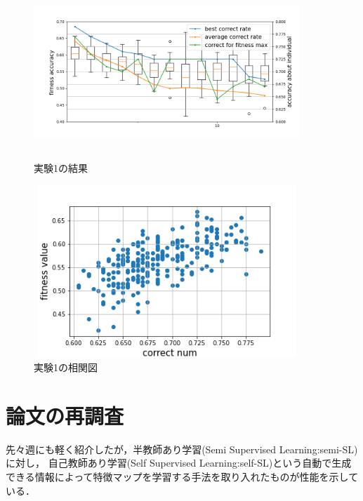 \documentclass[twocolumn]{jarticle}     %
\begin{document}
\begin{figure}[h]
	\begin{center}
		\vspace*{-3mm}
		\hspace*{-12mm}
		\includegraphics[height=65mm,width=100mm]{graph.png}
		\caption{実験1の結果\label{fig:ex1}}
	\end{center}
\end{figure}
\begin{figure}[h]
	\begin{center}
		\vspace*{-3mm}
		\hspace*{-12mm}
		\includegraphics[height=65mm,width=100mm]{img.png}
		\caption{実験1の相関図\label{fig:ex1_1}}
	\end{center}
\end{figure}




\section{論文の再調査}
先々週にも軽く紹介したが，半教師あり学習(Semi Supervised Learning:semi-SL) に対し，
自己教師あり学習(Self Supervised Learning:self-SL)という自動で生成できる情報によって特徴マップを学習する手法を取り入れたものが性能を示している．
\end{document}
